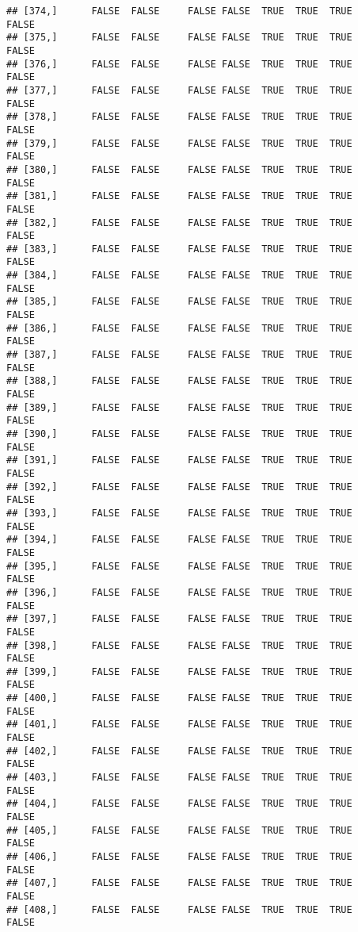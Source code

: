 \documentclass[
]{article}
\begin{document}
\begin{verbatim}
## [374,]      FALSE  FALSE     FALSE FALSE  TRUE  TRUE  TRUE         FALSE
## [375,]      FALSE  FALSE     FALSE FALSE  TRUE  TRUE  TRUE         FALSE
## [376,]      FALSE  FALSE     FALSE FALSE  TRUE  TRUE  TRUE         FALSE
## [377,]      FALSE  FALSE     FALSE FALSE  TRUE  TRUE  TRUE         FALSE
## [378,]      FALSE  FALSE     FALSE FALSE  TRUE  TRUE  TRUE         FALSE
## [379,]      FALSE  FALSE     FALSE FALSE  TRUE  TRUE  TRUE         FALSE
## [380,]      FALSE  FALSE     FALSE FALSE  TRUE  TRUE  TRUE         FALSE
## [381,]      FALSE  FALSE     FALSE FALSE  TRUE  TRUE  TRUE         FALSE
## [382,]      FALSE  FALSE     FALSE FALSE  TRUE  TRUE  TRUE         FALSE
## [383,]      FALSE  FALSE     FALSE FALSE  TRUE  TRUE  TRUE         FALSE
## [384,]      FALSE  FALSE     FALSE FALSE  TRUE  TRUE  TRUE         FALSE
## [385,]      FALSE  FALSE     FALSE FALSE  TRUE  TRUE  TRUE         FALSE
## [386,]      FALSE  FALSE     FALSE FALSE  TRUE  TRUE  TRUE         FALSE
## [387,]      FALSE  FALSE     FALSE FALSE  TRUE  TRUE  TRUE         FALSE
## [388,]      FALSE  FALSE     FALSE FALSE  TRUE  TRUE  TRUE         FALSE
## [389,]      FALSE  FALSE     FALSE FALSE  TRUE  TRUE  TRUE         FALSE
## [390,]      FALSE  FALSE     FALSE FALSE  TRUE  TRUE  TRUE         FALSE
## [391,]      FALSE  FALSE     FALSE FALSE  TRUE  TRUE  TRUE         FALSE
## [392,]      FALSE  FALSE     FALSE FALSE  TRUE  TRUE  TRUE         FALSE
## [393,]      FALSE  FALSE     FALSE FALSE  TRUE  TRUE  TRUE         FALSE
## [394,]      FALSE  FALSE     FALSE FALSE  TRUE  TRUE  TRUE         FALSE
## [395,]      FALSE  FALSE     FALSE FALSE  TRUE  TRUE  TRUE         FALSE
## [396,]      FALSE  FALSE     FALSE FALSE  TRUE  TRUE  TRUE         FALSE
## [397,]      FALSE  FALSE     FALSE FALSE  TRUE  TRUE  TRUE         FALSE
## [398,]      FALSE  FALSE     FALSE FALSE  TRUE  TRUE  TRUE         FALSE
## [399,]      FALSE  FALSE     FALSE FALSE  TRUE  TRUE  TRUE         FALSE
## [400,]      FALSE  FALSE     FALSE FALSE  TRUE  TRUE  TRUE         FALSE
## [401,]      FALSE  FALSE     FALSE FALSE  TRUE  TRUE  TRUE         FALSE
## [402,]      FALSE  FALSE     FALSE FALSE  TRUE  TRUE  TRUE         FALSE
## [403,]      FALSE  FALSE     FALSE FALSE  TRUE  TRUE  TRUE         FALSE
## [404,]      FALSE  FALSE     FALSE FALSE  TRUE  TRUE  TRUE         FALSE
## [405,]      FALSE  FALSE     FALSE FALSE  TRUE  TRUE  TRUE         FALSE
## [406,]      FALSE  FALSE     FALSE FALSE  TRUE  TRUE  TRUE         FALSE
## [407,]      FALSE  FALSE     FALSE FALSE  TRUE  TRUE  TRUE         FALSE
## [408,]      FALSE  FALSE     FALSE FALSE  TRUE  TRUE  TRUE         FALSE

\end{verbatim}
\end{document}
